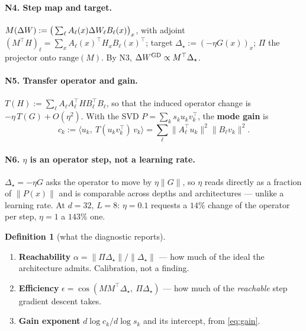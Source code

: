 \documentclass{article}
\newcommand{\NOTE}[1]{{\color{gray}\small #1}}
\theoremstyle{plain}\newtheorem{theorem}{Theorem}\newtheorem{lemma}[theorem]{Lemma}
\theoremstyle{definition}\newtheorem{definition}[theorem]{Definition}
\newcommand{\Dstar}{\Delta_\star}\newcommand{\Lam}{\Lambda}
\begin{document}
\paragraph{N4. Step map and target.}
$M(\Delta W):=\big(\sum_\ell A_\ell(x)\Delta W_\ell B_\ell(x)\big)_x$, with adjoint
$(M^\top H)_\ell=\sum_x A_\ell(x)^\top H_x B_\ell(x)^\top$; target $\Dstar:=(-\eta G(x))_x$;
$\Pi$ the projector onto $\mathrm{range}(M)$. By N3, $\dW^{\mathrm{GD}}\propto M^\top\Dstar$.

\paragraph{N5. Transfer operator and gain.}
$T(H):=\sum_\ell A_\ell A_\ell^\top H B_\ell^\top B_\ell$, so that the induced operator change is
$-\eta\,T(G)+O(\eta^2)$. With the SVD $P=\sum_k s_k u_kv_k^\top$, the \textbf{mode gain} is
\begin{equation}\label{eq:gain}
  c_k := \big\langle u_k,\ T(u_kv_k^\top)\,v_k\big\rangle
       = \sum_{\ell}\big\|A_\ell^\top u_k\big\|^2\big\|B_\ell v_k\big\|^2 .
\end{equation}

\paragraph{N6. $\eta$ is an operator step, not a learning rate.} $\Dstar=-\eta G$ asks the
operator to move by $\eta\|G\|$, so $\eta$ reads directly as a fraction of $\|P(x)\|$ and is
comparable across depths and architectures --- unlike a learning rate. \NOTE{At $d{=}32$,
$L{=}8$: $\eta=0.1$ requests a $14\%$ change of the operator per step, $\eta=1$ a $143\%$ one.}

\begin{definition}[what the diagnostic reports]\label{sec:diag}
\begin{enumerate}[label=(D\arabic*),leftmargin=*,itemsep=0pt]
  \item \textbf{Reachability} $\alpha=\|\Pi\Dstar\|/\|\Dstar\|$ --- how much of the ideal the
        architecture admits. Calibration, not a finding.
  \item \textbf{Efficiency} $\epsilon=\cos(MM^\top\Dstar,\ \Pi\Dstar)$ --- how much of the
        \emph{reachable} step gradient descent takes.
  \item \textbf{Gain exponent} $d\log c_k/d\log s_k$ and its intercept, from \eqref{eq:gain}.
\end{enumerate}
\end{definition}
\end{document}
